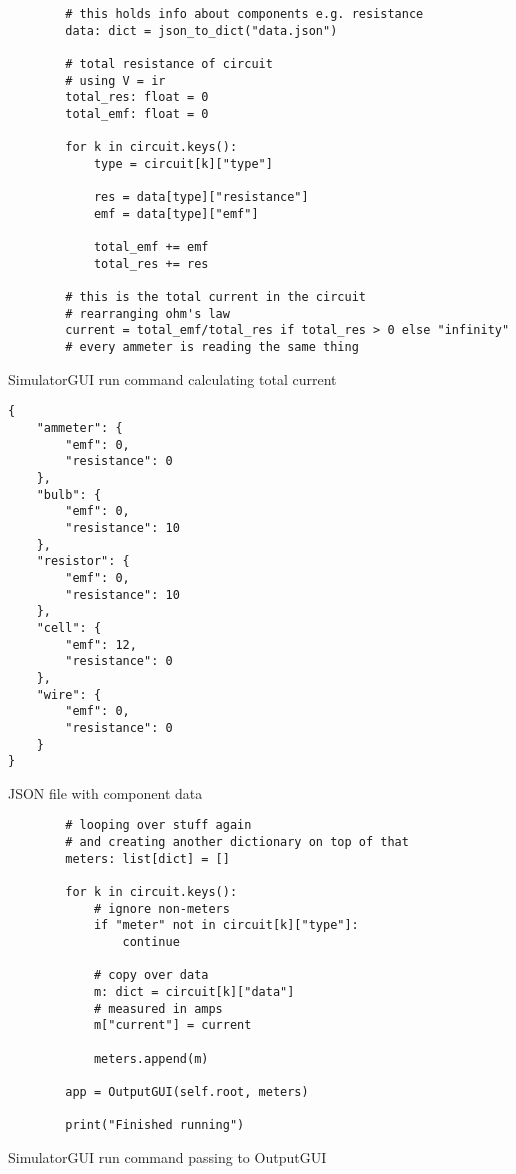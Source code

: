 \newpage
\begin{listing}[!ht]
    \begin{verbatim}
        # this holds info about components e.g. resistance 
        data: dict = json_to_dict("data.json")
        
        # total resistance of circuit
        # using V = ir
        total_res: float = 0
        total_emf: float = 0
        
        for k in circuit.keys():
            type = circuit[k]["type"]
            
            res = data[type]["resistance"]
            emf = data[type]["emf"]

            total_emf += emf
            total_res += res
            
        # this is the total current in the circuit
        # rearranging ohm's law
        current = total_emf/total_res if total_res > 0 else "infinity"
        # every ammeter is reading the same thing
    \end{verbatim}
    \caption{SimulatorGUI run command calculating total current}
    \label{sc:simgui-run-command-total-current}
\end{listing}

\newpage
\begin{listing}[!ht]
    \begin{verbatim}
{
    "ammeter": {
        "emf": 0,
        "resistance": 0
    },
    "bulb": {
        "emf": 0,
        "resistance": 10
    },
    "resistor": {
        "emf": 0,
        "resistance": 10
    },
    "cell": {
        "emf": 12,
        "resistance": 0
    },
    "wire": {
        "emf": 0,
        "resistance": 0
    }
}
    \end{verbatim}
    \caption{JSON file with component data}
    \label{sc:data-json-components}
\end{listing}

\newpage
\begin{listing}[!ht]
    \begin{verbatim}
        # looping over stuff again
        # and creating another dictionary on top of that
        meters: list[dict] = []
        
        for k in circuit.keys():
            # ignore non-meters
            if "meter" not in circuit[k]["type"]:
                continue
            
            # copy over data
            m: dict = circuit[k]["data"]
            # measured in amps
            m["current"] = current
            
            meters.append(m)
            
        app = OutputGUI(self.root, meters)
        
        print("Finished running")
    \end{verbatim}
    \caption{SimulatorGUI run command passing to OutputGUI}
    \label{sc:simgui-run-command-pass-to-outputgui}
\end{listing}